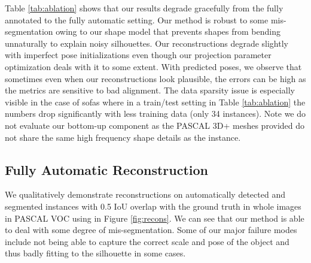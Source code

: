 Table \ref{tab:ablation} shows that our results degrade gracefully from the fully annotated to the fully automatic setting. Our method is robust to some mis-segmentation owing to our shape model that prevents shapes from bending unnaturally to explain noisy silhouettes. Our reconstructions degrade slightly with imperfect pose initializations even though our projection parameter optimization deals with it to some extent. With predicted poses, we observe that sometimes even when our reconstructions look plausible, the errors can be high as the metrics are sensitive to bad alignment. The data sparsity issue is especially visible in the case of sofas where in a train/test setting in Table \ref{tab:ablation} the numbers drop significantly with less training data (only 34 instances). Note we do not evaluate our bottom-up component as the PASCAL 3D+ meshes provided do not share the same high frequency shape details as the instance.

\subsection{Fully Automatic Reconstruction}
We qualitatively demonstrate reconstructions on automatically detected and segmented instances with 0.5 IoU overlap with the ground truth in whole images in PASCAL VOC using \cite{BharathECCV2014} in Figure \ref{fig:recons}. We can see that our method is able to deal with some degree of mis-segmentation. Some of our major failure modes include not being able to capture the correct scale and pose of the object and thus badly fitting to the silhouette in some cases.

